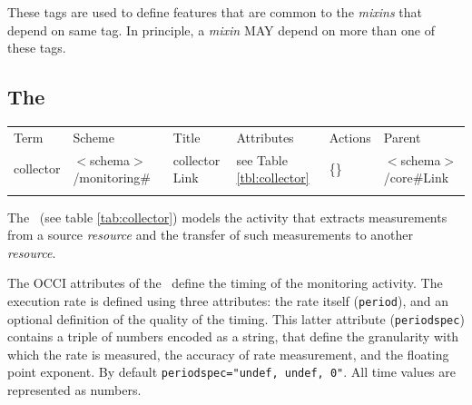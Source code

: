 \documentclass[10pt,a4paper]{article}
\begin{document}
These tags are used to define features that are common to the {\em mixins} that depend on same tag. In principle, a {\em mixin} MAY depend on more than one of these tags. 

\subsection{The \coll}

 {
        \begin{tabular}{llllll}
        \toprule
        Term & Scheme & Title & Attributes & Actions & Parent \\
        \colrule
        collector &  $<$schema$>$/monitoring\# & collector Link
        & see Table \ref{tbl:collector} & \{\} & $<$schema$>$/core\#Link\\
        \botrule
        \end{tabular}
}


The \coll\ (see table \ref{tab:collector}) models the activity that extracts measurements from a source {\em resource} and the transfer of such measurements to another {\em resource}.

The OCCI attributes of the \coll\ define the timing of the monitoring activity.
The execution rate is defined using three attributes: the rate itself (\verb|period|), and an optional definition of the quality of the timing. This latter attribute (\verb|periodspec|) contains a triple of numbers encoded as a string, that define the granularity with which the rate is measured, the accuracy of rate measurement, and the floating point exponent. By default \verb|periodspec="undef, undef, 0"|. All time values are represented as numbers.
\end{document}
